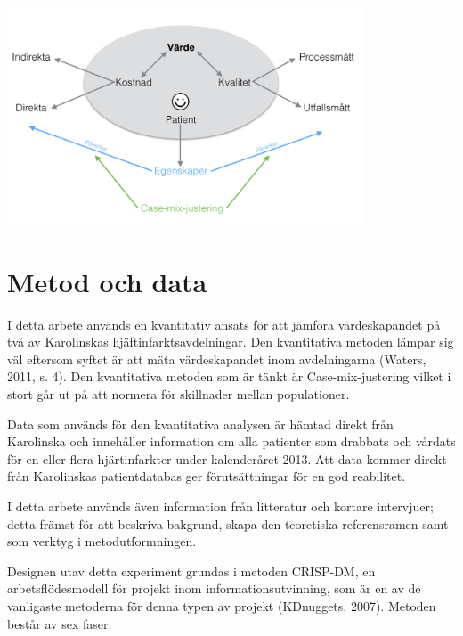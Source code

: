 \noindent\begin{minipage}{\textwidth}
\centering
\includegraphics[width=0.8\textwidth]{varde}
\label{tab:varde}            
\end{minipage}

\section{Metod och data}

I detta arbete används en kvantitativ ansats för att jämföra värdeskapandet på två av Karolinskas hjäftinfarktsavdelningar. Den kvantitativa metoden lämpar sig väl eftersom syftet är att mäta värdeskapandet inom avdelningarna (Waters, 2011, s. 4). Den kvantitativa metoden som är tänkt är Case-mix-justering vilket i stort går ut på att normera för skillnader mellan populationer. 

Data som används för den kvantitativa analysen är hämtad direkt från Karolinska och innehåller information om alla patienter som drabbats och vårdats för en eller flera hjärtinfarkter under kalenderåret 2013. Att data kommer direkt från Karolinskas patientdatabas ger förutsättningar för en god reabilitet.

I detta arbete används även information från litteratur och kortare intervjuer; detta främst för att beskriva bakgrund, skapa den teoretiska referensramen samt som verktyg i metodutformningen.

Designen utav detta experiment grundas i metoden CRISP-DM, en arbetsflödesmodell för projekt inom informationsutvinning, som är en av de vanligaste metoderna för denna typen av projekt (KDnuggets, 2007). Metoden består av sex faser:

